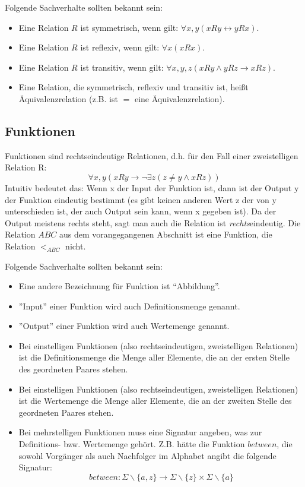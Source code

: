 \noindent
Folgende Sachverhalte sollten bekannt sein:
\begin{itemize}
    \item Eine Relation $R$ ist symmetrisch, wenn gilt: $\forall x,y(xRy \leftrightarrow yRx)$.
    \item Eine Relation $R$ ist reflexiv, wenn gilt: $\forall x(xRx)$.
    \item Eine Relation $R$ ist transitiv,
        wenn gilt: $\forall x,y,z(xRy \wedge yRz \rightarrow xRz)$.
    \item Eine Relation, die symmetrisch, reflexiv und transitiv ist,
          heißt Äquivalenzrelation (z.B. ist $=$ eine Äquivalenzrelation).
\end{itemize}

\subsection{Funktionen}
Funktionen sind rechtseindeutige Relationen,
d.h. für den Fall einer zweistelligen Relation R:
\[
    \forall x,y (xRy \rightarrow \neg \exists z (z \neq y \wedge xRz))
\]
Intuitiv bedeutet das: Wenn x der Input der Funktion ist,
dann ist der Output y der Funktion eindeutig bestimmt
(es gibt keinen anderen Wert z der von y unterschieden ist,
der auch Output sein kann, wenn x gegeben ist).
Da der Output meistens rechts steht, sagt man auch die Relation ist \emph{rechts}eindeutig.
Die Relation $ABC$ aus dem vorangegangenen Abschnitt ist eine Funktion,
die Relation $<_{ABC}$ nicht.

Folgende Sachverhalte sollten bekannt sein:
\begin{itemize}
    \item Eine andere Bezeichnung für Funktion ist ``Abbildung''.
    \item ''Input'' einer Funktion wird auch Definitionsmenge genannt.
    \item ''Output'' einer Funktion wird auch Wertemenge genannt.
    \item Bei einstelligen Funktionen (also rechtseindeutigen, zweistelligen Relationen)
        ist die Definitionsmenge die Menge aller Elemente,
        die an der ersten Stelle des geordneten Paares stehen.
    \item Bei einstelligen Funktionen (also rechtseindeutigen, zweistelligen Relationen)
        ist die Wertemenge die Menge aller Elemente,
        die an der zweiten Stelle des geordneten Paares stehen.
    \item Bei mehrstelligen Funktionen muss eine Signatur angeben, was zur Definitions-
        bzw. Wertemenge gehört. Z.B. hätte die Funktion $between$,
        die sowohl Vorgänger als auch Nachfolger im Alphabet angibt die folgende Signatur:
        \[ between:
            \Sigma \backslash \{a,z\}
            \rightarrow
            \Sigma \backslash \{z\} \times \Sigma \backslash \{a\} \]
\end{itemize}

